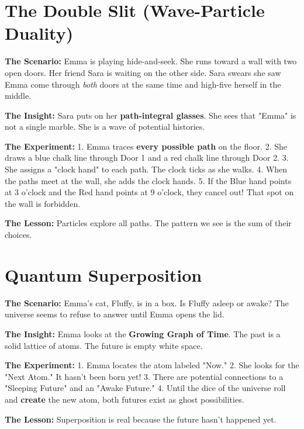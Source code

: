 \documentclass[11pt, a4paper, openany]{book}
\begin{document}
\section{The Double Slit (Wave-Particle Duality)}
\begin{thoughtexp}
\textbf{The Scenario:} Emma is playing hide-and-seek. She runs toward a wall with two open doors. Her friend Sara is waiting on the other side. Sara swears she saw Emma come through \emph{both} doors at the same time and high-five herself in the middle.

\textbf{The Insight:} Sara puts on her \textbf{path-integral glasses}. She sees that "Emma" is not a single marble. She is a wave of potential histories.

\textbf{The Experiment:}
1. Emma traces \textbf{every possible path} on the floor.
2. She draws a blue chalk line through Door 1 and a red chalk line through Door 2.
3. She assigns a "clock hand" to each path. The clock ticks as she walks.
4. When the paths meet at the wall, she adds the clock hands.
5. If the Blue hand points at 3 o'clock and the Red hand points at 9 o'clock, they cancel out! That spot on the wall is forbidden.

\textbf{The Lesson:} Particles explore all paths. The pattern we see is the sum of their choices.
\end{thoughtexp}

\section{Quantum Superposition}
\begin{thoughtexp}
\textbf{The Scenario:} Emma's cat, Fluffy, is in a box. Is Fluffy asleep or awake? The universe seems to refuse to answer until Emma opens the lid.

\textbf{The Insight:} Emma looks at the \textbf{Growing Graph of Time}. The past is a solid lattice of atoms. The future is empty white space.

\textbf{The Experiment:}
1. Emma locates the atom labeled "Now."
2. She looks for the "Next Atom." It hasn't been born yet!
3. There are potential connections to a "Sleeping Future" and an "Awake Future."
4. Until the dice of the universe roll and \textbf{create} the new atom, both futures exist as ghost possibilities.

\textbf{The Lesson:} Superposition is real because the future hasn't happened yet.
\end{thoughtexp}
\end{document}
